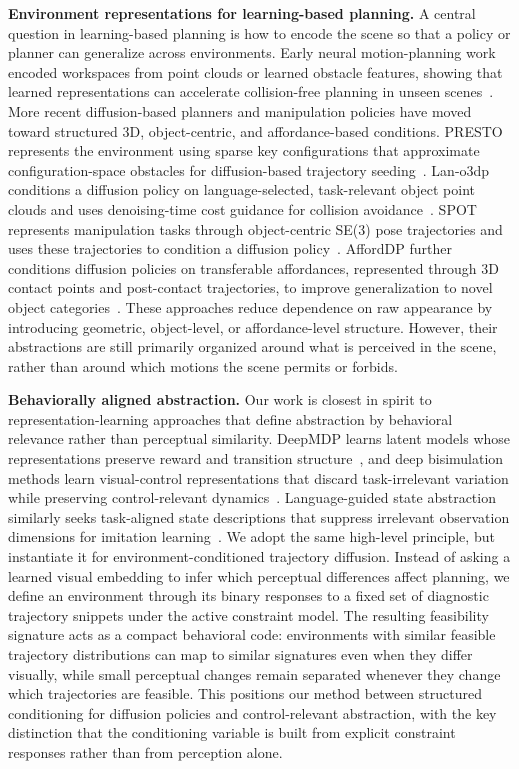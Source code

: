 \textbf{Environment representations for learning-based planning.}
A central question in learning-based planning is how to encode the scene so that a policy or planner can generalize across environments. Early neural motion-planning work encoded workspaces from point clouds or learned obstacle features, showing that learned representations can accelerate collision-free planning in unseen scenes~\cite{strudel2021obstacle}. More recent diffusion-based planners and manipulation policies have moved toward structured 3D, object-centric, and affordance-based conditions. PRESTO represents the environment using sparse key configurations that approximate configuration-space obstacles for diffusion-based trajectory seeding~\cite{seo2024presto}. Lan-o3dp conditions a diffusion policy on language-selected, task-relevant object point clouds and uses denoising-time cost guidance for collision avoidance~\cite{li2024lano3dp}. SPOT represents manipulation tasks through object-centric SE(3) pose trajectories and uses these trajectories to condition a diffusion policy~\cite{hsu2025spot}. AffordDP further conditions diffusion policies on transferable affordances, represented through 3D contact points and post-contact trajectories, to improve generalization to novel object categories~\cite{wu2025afforddp}. These approaches reduce dependence on raw appearance by introducing geometric, object-level, or affordance-level structure. However, their abstractions are still primarily organized around what is perceived in the scene, rather than around which motions the scene permits or forbids.

\textbf{Behaviorally aligned abstraction.}
Our work is closest in spirit to representation-learning approaches that define abstraction by behavioral relevance rather than perceptual similarity. DeepMDP learns latent models whose representations preserve reward and transition structure~\cite{gelada2019deepmdp}, and deep bisimulation methods learn visual-control representations that discard task-irrelevant variation while preserving control-relevant dynamics~\cite{zhang2020invariant}. Language-guided state abstraction similarly seeks task-aligned state descriptions that suppress irrelevant observation dimensions for imitation learning~\cite{peng2024languageguided}. We adopt the same high-level principle, but instantiate it for environment-conditioned trajectory diffusion. Instead of asking a learned visual embedding to infer which perceptual differences affect planning, we define an environment through its binary responses to a fixed set of diagnostic trajectory snippets under the active constraint model. The resulting feasibility signature acts as a compact behavioral code: environments with similar feasible trajectory distributions can map to similar signatures even when they differ visually, while small perceptual changes remain separated whenever they change which trajectories are feasible. This positions our method between structured conditioning for diffusion policies and control-relevant abstraction, with the key distinction that the conditioning variable is built from explicit constraint responses rather than from perception alone.


